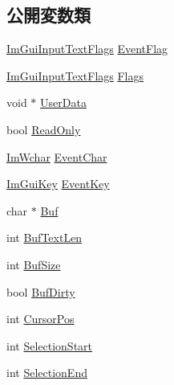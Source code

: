 \subsection*{公開変数類}
\begin{DoxyCompactItemize}
\item 
\mbox{\hyperlink{imgui_8h_a7d2c6153a6b9b5d3178ce82434ac9fb8}{Im\+Gui\+Input\+Text\+Flags}} \mbox{\hyperlink{struct_im_gui_text_edit_callback_data_aee2fa13574284d68d4025a26d32eba55}{Event\+Flag}}
\item 
\mbox{\hyperlink{imgui_8h_a7d2c6153a6b9b5d3178ce82434ac9fb8}{Im\+Gui\+Input\+Text\+Flags}} \mbox{\hyperlink{struct_im_gui_text_edit_callback_data_a6ffea1ffba5aaa267937ea362b844e8c}{Flags}}
\item 
void $\ast$ \mbox{\hyperlink{struct_im_gui_text_edit_callback_data_aaf4994a17aefa6ace9cf8f7c2fa06cf7}{User\+Data}}
\item 
bool \mbox{\hyperlink{struct_im_gui_text_edit_callback_data_a37cec257a392910f386188978027541c}{Read\+Only}}
\item 
\mbox{\hyperlink{imgui_8h_af2c7badaf05a0008e15ef76d40875e97}{Im\+Wchar}} \mbox{\hyperlink{struct_im_gui_text_edit_callback_data_acda2ae8b38e0596adf2f01036ac06612}{Event\+Char}}
\item 
\mbox{\hyperlink{imgui_8h_a1671ca739cf1384a8cc268758f27b4e7}{Im\+Gui\+Key}} \mbox{\hyperlink{struct_im_gui_text_edit_callback_data_a476e640ad7f2f18ae5518dbc7cc33c55}{Event\+Key}}
\item 
char $\ast$ \mbox{\hyperlink{struct_im_gui_text_edit_callback_data_aecd0741ee3feccbb5482e308292611bc}{Buf}}
\item 
int \mbox{\hyperlink{struct_im_gui_text_edit_callback_data_a98d0d0b8c32d8466ba2f07b7daee9c08}{Buf\+Text\+Len}}
\item 
int \mbox{\hyperlink{struct_im_gui_text_edit_callback_data_ae22679499dd9df688f4fabf1b9e8d048}{Buf\+Size}}
\item 
bool \mbox{\hyperlink{struct_im_gui_text_edit_callback_data_a1ba304d589e00bece6400d43451d864e}{Buf\+Dirty}}
\item 
int \mbox{\hyperlink{struct_im_gui_text_edit_callback_data_aded0e6e87c2dcb66546ae6298e5a8a01}{Cursor\+Pos}}
\item 
int \mbox{\hyperlink{struct_im_gui_text_edit_callback_data_a1634bec3717f7e386033051cf604efed}{Selection\+Start}}
\item 
int \mbox{\hyperlink{struct_im_gui_text_edit_callback_data_af3371b7f36bd6c2b528b033bdb1785a2}{Selection\+End}}
\end{DoxyCompactItemize}


